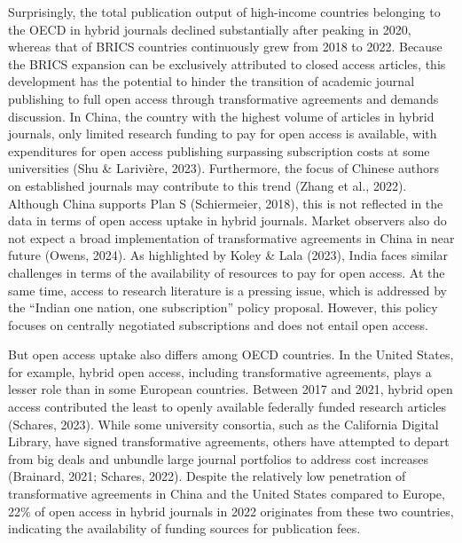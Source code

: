 \documentclass[a4paper,man,floatsintext,longtable,noextraspace,12pt]{apa6}
\begin{document}
Surprisingly, the total publication output of high-income countries
belonging to the OECD in hybrid journals declined substantially after
peaking in 2020, whereas that of BRICS countries continuously grew from
2018 to 2022. Because the BRICS expansion can be exclusively attributed
to closed access articles, this development has the potential to hinder
the transition of academic journal publishing to full open access
through transformative agreements and demands discussion. In China, the
country with the highest volume of articles in hybrid journals, only
limited research funding to pay for open access is available, with
expenditures for open access publishing surpassing subscription costs at
some universities (Shu \& Larivière, 2023). Furthermore, the focus of
Chinese authors on established journals may contribute to this trend
(Zhang et al., 2022). Although China supports Plan S (Schiermeier,
2018), this is not reflected in the data in terms of open access uptake
in hybrid journals. Market observers also do not expect a broad
implementation of transformative agreements in China in near future
(Owens, 2024). As highlighted by Koley \& Lala (2023), India faces
similar challenges in terms of the availability of resources to pay for
open access. At the same time, access to research literature is a
pressing issue, which is addressed by the ``Indian one nation, one
subscription'' policy proposal. However, this policy focuses on
centrally negotiated subscriptions and does not entail open access.

But open access uptake also differs among OECD countries. In the United
States, for example, hybrid open access, including transformative
agreements, plays a lesser role than in some European countries. Between
2017 and 2021, hybrid open access contributed the least to openly
available federally funded research articles (Schares, 2023). While some
university consortia, such as the California Digital Library, have
signed transformative agreements, others have attempted to depart from
big deals and unbundle large journal portfolios to address cost
increases (Brainard, 2021; Schares, 2022). Despite the relatively low
penetration of transformative agreements in China and the United States
compared to Europe, 22\% of open access in hybrid journals in 2022
originates from these two countries, indicating the availability of
funding sources for publication fees.
\end{document}
